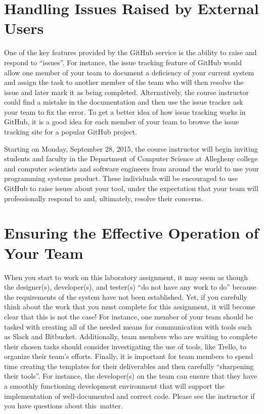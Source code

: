 \vspace*{-.05in}
\section*{Handling Issues Raised by External Users}

One of the key features provided by the GitHub service is the ability to raise and respond to ``issues''. For instance,
the issue tracking feature of GitHub would allow one member of your team to document a deficiency of your current system
and assign the task to another member of the team who will then resolve the issue and later mark it as being completed.
Alternatively, the course instructor could find a mistake in the documentation and then use the issue tracker ask your
team to fix the error. To get a better idea of how issue tracking works in GitHub, it is a good idea for each member of
your team to browse the issue tracking site for a popular GitHub project.

Starting on Monday, September 28, 2015, the course instructor will begin inviting students and faculty in the Department
of Computer Science at Allegheny college and computer scientists and software engineers from around the world to use your
programming systems product. These individuals will be encouraged to use GitHub to raise issues about your tool, under
the expectation that your team will professionally respond to and, ultimately, resolve their concerns.

\section*{Ensuring the Effective Operation of Your Team}

When you start to work on this laboratory assignment, it may seem as though the designer(s), developer(s), and tester(s)
``do not have any work to do'' because the requirements of the system have not been established. Yet, if you carefully
think about the work that you must complete for this assignment, it will become clear that this is not the case! For
instance, one member of your team should be tasked with creating all of the needed means for communication with tools
such as Slack and Bitbucket. Additionally, team members who are waiting to complete their chosen tasks should consider
investigating the use of tools, like Trello, to organize their team's efforts. Finally, it is important for team
members to spend time creating the templates for their deliverables and then carefully ``sharpening their tools''. For
instance, the developer(s) on the team can ensure that they have a smoothly functioning development environment that
will support the implementation of well-documented and correct code. Please see the instructor if you have questions
about \mbox{this matter}.


